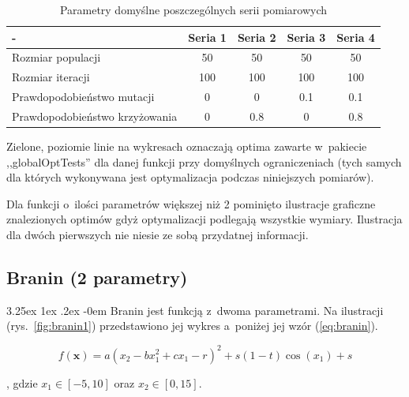 \documentclass[11pt, a4paper]{article}
\makeatletter
\newcommand{\fbi}{\leavevmode{\parindent=1em\indent}}
\renewcommand\paragraph{\@startsection{paragraph}{5}{\z@}
  {3.25ex \@plus1ex \@minus.2ex}
  {-0em}
  {\normalfont\normalsize\bfseries}}
\makeatother
\begin{document}
\begin{table}[H]
	\centering
	\caption{Parametry domyślne poszczególnych serii pomiarowych}
	\label{tab:parametry}
	\begin{tabularx}{\textwidth}{|X|c|c|c|c|}
		\hline
		- & Seria 1 & Seria 2 & Seria 3 & Seria 4\\ 
		\hline
		Rozmiar populacji & 50 & 50 & 50 & 50 \\ 
		\hline 
		Rozmiar iteracji & 100 & 100 & 100 & 100 \\ 
		\hline 
		Prawdopodobieństwo mutacji & 0 & 0 & 0.1 & 0.1 \\ 
		\hline 
		Prawdopodobieństwo krzyżowania & 0 & 0.8 & 0 & 0.8 \\ 
		\hline 
	\end{tabularx} 
\end{table}

\fbi
Zielone, poziomie linie na wykresach oznaczają optima zawarte w~pakiecie ,,globalOptTests'' dla danej funkcji przy domyślnych ograniczeniach (tych samych dla których wykonywana jest optymalizacja podczas niniejszych pomiarów).

\fbi
Dla funkcji o~ilości parametrów większej niż 2 pominięto ilustracje graficzne znalezionych optimów gdyż optymalizacji podlegają wszystkie wymiary. Ilustracja dla dwóch pierwszych nie niesie ze sobą przydatnej informacji.

\newpage
\subsection{Branin (2 parametry)}
\paragraph{}
Branin jest funkcją z~dwoma parametrami. Na ilustracji (rys.~\ref{fig:branin1}) przedstawiono jej wykres a~poniżej jej wzór (\ref{eq:branin}).

\begin{equation}\label{eq:branin}
	f(\boldsymbol{x}) = a(x_2 - bx_1^2 + cx_1 - r)^2 + s(1 - t)\cos(x_1) + s
\end{equation}

, gdzie $ x_1 \in [-5, 10] $ oraz $ x_2 \in [0, 15] $.
\end{document}

